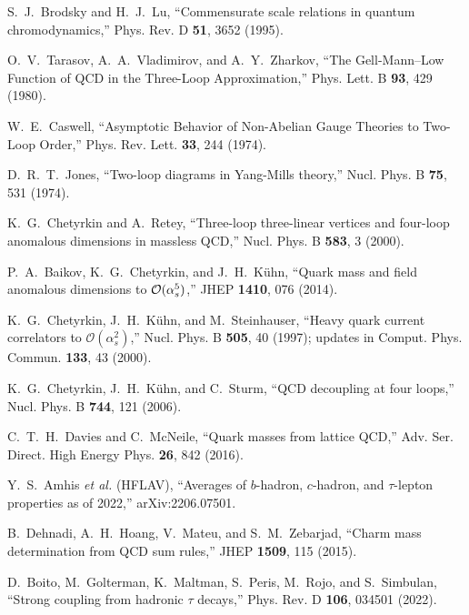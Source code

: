 \documentclass[aps,prd,onecolumn,amsmath,amssymb,superscriptaddress,nofootinbib,showpacs,showkeys]{revtex4-2}
\begin{document}
\begin{thebibliography}{99}
S.~J.~Brodsky and H.~J.~Lu,
``Commensurate scale relations in quantum chromodynamics,''
Phys. Rev. D \textbf{51}, 3652 (1995).



O.~V.~Tarasov, A.~A.~Vladimirov, and A.~Y.~Zharkov,
``The Gell-Mann–Low Function of QCD in the Three-Loop Approximation,''
Phys. Lett. B \textbf{93}, 429 (1980).

W.~E.~Caswell,
``Asymptotic Behavior of Non-Abelian Gauge Theories to Two-Loop Order,''
Phys. Rev. Lett. \textbf{33}, 244 (1974).

D.~R.~T.~Jones,
``Two-loop diagrams in Yang-Mills theory,''
Nucl. Phys. B \textbf{75}, 531 (1974).

K.~G.~Chetyrkin and A.~Retey,
``Three-loop three-linear vertices and four-loop anomalous dimensions in massless QCD,''
Nucl. Phys. B \textbf{583}, 3 (2000).

P.~A.~Baikov, K.~G.~Chetyrkin, and J.~H.~Kühn,
``Quark mass and field anomalous dimensions to ${\cal O}(\alpha_s^5)$,''
JHEP \textbf{1410}, 076 (2014).

K.~G.~Chetyrkin, J.~H.~Kühn, and M.~Steinhauser,
``Heavy quark current correlators to $\mathcal{O}(\alpha_s^2)$,''
Nucl. Phys. B \textbf{505}, 40 (1997); updates in Comput. Phys. Commun. \textbf{133}, 43 (2000).

K.~G.~Chetyrkin, J.~H.~Kühn, and C.~Sturm,
``QCD decoupling at four loops,''
Nucl. Phys. B \textbf{744}, 121 (2006).

C.~T.~H.~Davies and C.~McNeile,
``Quark masses from lattice QCD,''
Adv. Ser. Direct. High Energy Phys. \textbf{26}, 842 (2016).





Y.~S.~Amhis \emph{et al.} (HFLAV),
``Averages of $b$-hadron, $c$-hadron, and $\tau$-lepton properties as of 2022,''
arXiv:2206.07501.

B.~Dehnadi, A.~H.~Hoang, V.~Mateu, and S.~M.~Zebarjad,
``Charm mass determination from QCD sum rules,''
JHEP \textbf{1509}, 115 (2015).

D.~Boito, M.~Golterman, K.~Maltman, S.~Peris, M.~Rojo, and S.~Simbulan,
``Strong coupling from hadronic $\tau$ decays,''
Phys. Rev. D \textbf{106}, 034501 (2022).



\end{thebibliography}
\end{document}
